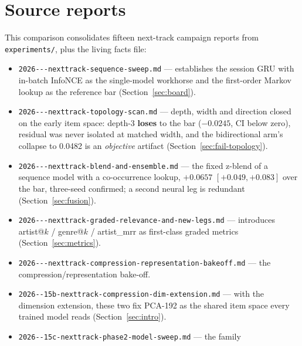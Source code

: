\documentclass[11pt]{article}
\begin{document}
\clearpage
\section{Source reports}
\label{sec:sources}

This comparison consolidates fifteen next-track campaign reports from
\texttt{experiments/}, plus the living facts file:

\begin{itemize}
  \raggedright
  \item \texttt{2026---\allowbreak nexttrack-\allowbreak sequence-\allowbreak sweep.md} --- establishes the
  session GRU with in-batch InfoNCE as the single-model workhorse and the
  first-order Markov lookup as the reference bar (Section~\ref{sec:board}).
  \item \texttt{2026---\allowbreak nexttrack-\allowbreak topology-\allowbreak scan.md} --- depth, width and
  direction closed on the early item space: depth-3 \textbf{loses} to the bar
  ($-\num{0.0245}$, CI below zero), residual was never isolated at matched width,
  and the bidirectional arm's collapse to \num{0.0482} is an \emph{objective}
  artifact
  (Section~\ref{sec:fail-topology}).
  \item \texttt{2026---\allowbreak nexttrack-\allowbreak blend-\allowbreak and-\allowbreak ensemble.md} --- the fixed
  z-blend of a sequence model with a co-occurrence lookup, $+\num{0.0657}$
  $[+\num{0.049},+\num{0.083}]$ over the bar, three-seed confirmed; a second
  neural leg is redundant (Section~\ref{sec:fusion}).
  \item \texttt{2026---\allowbreak nexttrack-\allowbreak graded-\allowbreak relevance-\allowbreak and-\allowbreak new-\allowbreak legs.md} ---
  introduces artist@$k$ / genre@$k$ / artist\_mrr as first-class graded metrics
  (Section~\ref{sec:metrics}).
  \item \texttt{2026---\allowbreak nexttrack-\allowbreak compression-\allowbreak representation-\allowbreak bakeoff.md}
  --- the compression/representation bake-off.
  \item \texttt{2026--\allowbreak 15b-\allowbreak nexttrack-\allowbreak compression-\allowbreak dim-\allowbreak extension.md} --- with the
  dimension extension, these two fix PCA-192 as the shared item space every
  trained model reads (Section~\ref{sec:intro}).
  \item \texttt{2026--\allowbreak 15c-\allowbreak nexttrack-\allowbreak phase2-\allowbreak model-\allowbreak sweep.md} --- the family

\end{itemize}
\end{document}
